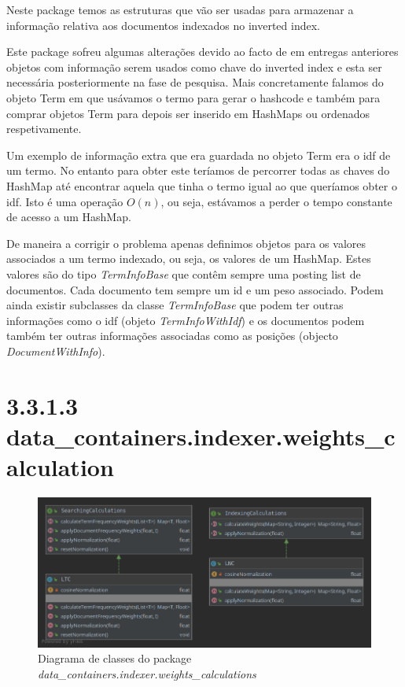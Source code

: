 \documentclass[12pt]{article}
\begin{document}
Neste package temos as estruturas que vão ser usadas para armazenar a
informação relativa aos documentos indexados no inverted index.

Este package sofreu algumas alterações devido ao facto de em entregas
anteriores objetos com informação serem usados como chave do inverted
index e esta ser necessária posteriormente na fase de pesquisa. Mais
concretamente falamos do objeto Term em que usávamos o termo para
gerar o hashcode e também para comprar objetos Term para depois ser
inserido em HashMaps ou ordenados respetivamente.

Um exemplo de informação extra que era guardada no objeto Term era o
idf de um termo. No entanto para obter este teríamos de percorrer
todas as chaves do HashMap até encontrar aquela que tinha o termo
igual ao que queríamos obter o idf. Isto é uma operação $O(n)$, ou
seja, estávamos a perder o tempo constante de acesso a um HashMap.

De maneira a corrigir o problema apenas definimos objetos para os
valores associados a um termo indexado, ou seja, os valores de um
HashMap. Estes valores são do tipo {\it TermInfoBase} que contêm
sempre uma posting list de documentos. Cada documento tem sempre um
id e um peso associado. Podem ainda existir subclasses da classe {\it
TermInfoBase} que podem ter outras informações como o idf (objeto
{\it TermInfoWithIdf}) e os documentos podem também ter outras
informações associadas como as posições (objecto {\it
DocumentWithInfo}).

\section*{3.3.1.3 data\_containers.indexer.weights\_calculation}
\begin{figure}[H]
  \center
   \includegraphics[width=15cm]{packages_data_containers_indexer_weights_calculation.png}
  \caption{Diagrama de classes do package \it
    data\_containers.indexer.weights\_calculations}
\end{figure}
\end{document}
